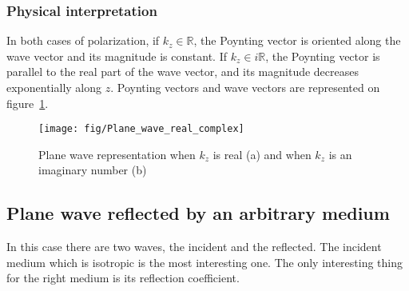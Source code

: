 \subsubsection{Physical interpretation}
In both cases of polarization, if $k_z\in \mathbb{R}$, the Poynting vector is oriented along the wave vector and its magnitude is constant. If $k_z\in i\mathbb{R}$, the Poynting vector is parallel to the real part of the wave vector, and its magnitude decreases exponentially along $z$. Poynting vectors and wave vectors are represented on figure~\ref{fig:Plane_wave_real_complex}.\\
\begin{figure}[h!]
\texttt{[image: fig/Plane\_wave\_real\_complex]}
\caption{\label{fig:Plane_wave_real_complex}Plane  wave representation when $k_z$ is real (a) and when $k_z$ is an imaginary number (b)}
\end{figure}

\subsection{Plane wave reflected by an arbitrary medium}
In this case there are two waves, the incident and the reflected. The incident medium which is isotropic is the most interesting one. The only interesting thing for the right medium is its reflection coefficient.
